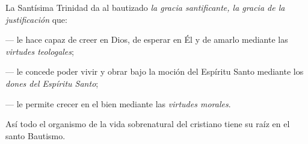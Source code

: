 La Santísima Trinidad da al bautizado \emph{la gracia santificante, la gracia de la justificación} que:

--- le hace capaz de creer en Dios, de esperar en Él y de amarlo mediante las \emph{virtudes teologales};

--- le concede poder vivir y obrar bajo la moción del Espíritu Santo mediante los \emph{dones del Espíritu Santo};

--- le permite crecer en el bien mediante las \emph{virtudes morales}.

Así todo el organismo de la vida sobrenatural del cristiano tiene su raíz en el santo Bautismo.
